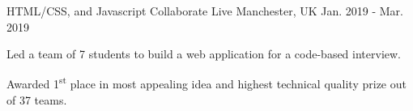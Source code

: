\begin{cventries}
  \cventry
    {HTML/CSS, and Javascript} %
    {Collaborate Live} %
    {Manchester, UK} %
    {Jan. 2019 - Mar. 2019} %
    {
      \begin{cvitems} %
        \item {Led a team of 7 students to build a web application for a code-based interview.}
        \item {Awarded 1\textsuperscript{st} place in most appealing idea and highest technical quality prize out of 37 teams.}
      \end{cvitems}
    }
    
  


\end{cventries}

